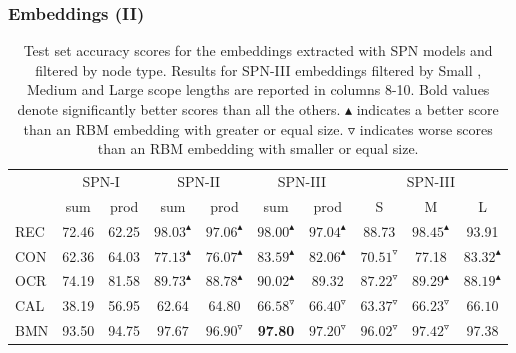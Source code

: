 \documentclass[10pt, t, xcolor={usenames,dvipsnames,svgnames}, compress]{beamer}
\begin{document}
\begin{frame}
  \frametitle{Embeddings (II)}
  \begin{table}[!t]
    \footnotesize
    \caption[datasets]{Test set accuracy scores for the embeddings
      extracted with \textsf{SPN} models and filtered by node
      type. Results for \textsf{SPN-III} embeddings filtered by \textsf{S}mall
      , \textsf{M}edium and \textsf{L}arge scope
      lengths are reported in columns 8-10.
      Bold values denote significantly better scores than all the others.
      $\blacktriangle$ indicates a better score than an RBM embedding
      with greater or equal size. $\triangledown$ indicates worse
      scores than an RBM embedding with smaller or equal size.}
    \centering
    \small
    \setlength{\tabcolsep}{3pt}  
    \begin{tabular}{l c c c c c c | c c c}
      \toprule
      & \multicolumn{2}{c}{\textsf{SPN-I}} &
                                             \multicolumn{2}{c}{\textsf{SPN-II}}
      & \multicolumn{2}{c}{\textsf{SPN-III}} & \multicolumn{3}{c}{\textsf{SPN-III}}\\
      
      &sum  & prod& sum& prod& sum& prod & \textsf{S} & \textsf{M} & \textsf{L}\\
      \midrule
      \textsf{REC} & 72.46& 62.25& $\mathbf{98.03}^{\blacktriangle}$& $97.06^{\blacktriangle}$& $\mathbf{98.00}^{\blacktriangle}$& $97.04^{\blacktriangle}$ & 88.73&$\mathbf{98.45}^{\blacktriangle}$& 93.91\\
      \midrule
      \textsf{CON} & 62.36& 64.03& $77.13^{\blacktriangle}$& $76.07^{\blacktriangle}$& $\mathbf{83.59}^{\blacktriangle}$& $82.06^{\blacktriangle}$ &$70.51^{\triangledown}$&77.18&$\mathbf{83.32}^{\blacktriangle}$\\
      \midrule
      \textsf{OCR} & 74.19& 81.58& $89.73^{\blacktriangle}$& $88.78^{\blacktriangle}$& $\mathbf{90.02}^{\blacktriangle}$& 89.32 & $87.22^{\triangledown}$& $\mathbf{89.29}^{\blacktriangle}$& $88.19^{\blacktriangle}$\\
      \midrule
      \textsf{CAL} & 38.19& 56.95& 62.64& 64.80& $\mathbf{66.58}^{\triangledown}$& $66.40^{\triangledown}$& $63.37^{\triangledown}$& $\mathbf{66.23}^{\triangledown}$& $66.10$\\
      \midrule
      \textsf{BMN} & 93.50& 94.75& $97.67$& $96.90^{\triangledown}$& \textbf{97.80}& $97.20^{\triangledown}$ & $96.02^{\triangledown}$& $\mathbf{97.42^{\triangledown}}$& 97.38\\
      \bottomrule
    \end{tabular}
    \label{tab:model-filter-accs}
  \end{table}
\end{frame}
\end{document}
